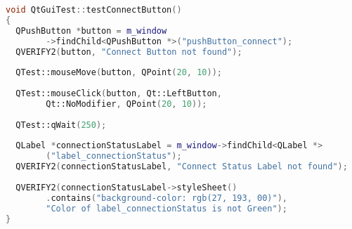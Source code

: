 		\begin{lstlisting}[language=C++]
void QtGuiTest::testConnectButton()
{
  QPushButton *button = m_window
        ->findChild<QPushButton *>("pushButton_connect");
  QVERIFY2(button, "Connect Button not found");
	
  QTest::mouseMove(button, QPoint(20, 10));
	
  QTest::mouseClick(button, Qt::LeftButton, 
        Qt::NoModifier, QPoint(20, 10));
	
  QTest::qWait(250);
	
  QLabel *connectionStatusLabel = m_window->findChild<QLabel *>
        ("label_connectionStatus");
  QVERIFY2(connectionStatusLabel, "Connect Status Label not found");
	
  QVERIFY2(connectionStatusLabel->styleSheet()
        .contains("background-color: rgb(27, 193, 00)"), 
		"Color of label_connectionStatus is not Green");
}
		\end{lstlisting}
		
